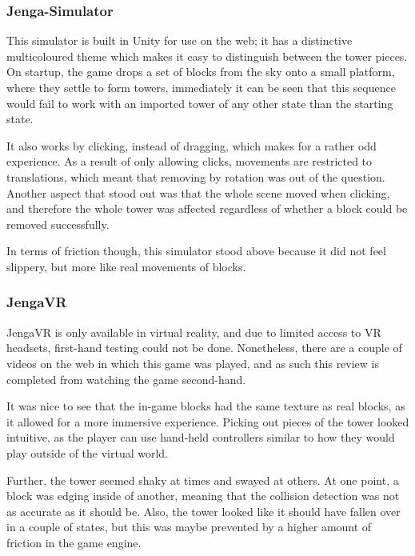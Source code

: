 \subsubsection{\protect{} Jenga-Simulator}

This simulator is built in Unity for use on the web; it has a distinctive multicoloured theme which makes it easy to distinguish between the tower pieces. On startup, the game drops a set of blocks from the sky onto a small platform, where they settle to form towers, immediately it can be seen that this sequence would fail to work with an imported tower of any other state than the starting state.

It also works by clicking, instead of dragging, which makes for a rather odd experience. As a result of only allowing clicks, movements are restricted to translations, which meant that removing by rotation was out of the question. Another aspect that stood out was that the whole scene moved when clicking, and therefore the whole tower was affected regardless of whether a block could be removed successfully.

In terms of friction though, this simulator stood above  because it did not feel slippery, but more like real movements of \jenga{} blocks.

\subsubsection{\protect{} JengaVR}

JengaVR is only available in virtual reality, and due to limited access to VR headsets, first-hand testing could not be done. Nonetheless, there are a couple of videos on the web in which this game was played, and as such this review is completed from watching the game second-hand.

It was nice to see that the in-game blocks had the same texture as real \jenga{} blocks, as it allowed for a more immersive experience. Picking out pieces of the tower looked intuitive, as the player can use hand-held controllers similar to how they would play outside of the virtual world.

Further, the tower seemed shaky at times and swayed at others. At one point, a block was edging inside of another, meaning that the collision detection was not as accurate as it should be. Also, the tower looked like it should have fallen over in a couple of states, but this was maybe prevented by a higher amount of friction in the game engine.

